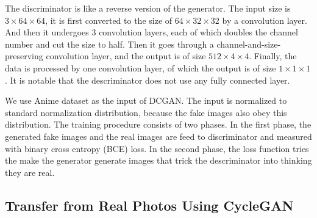 \documentclass[10pt,twocolumn,letterpaper]{article}
\begin{document}
The discriminator is like a reverse version of the generator. The input size is
$3\times 64\times 64$, it is first converted to the size of
$64\times 32\times 32$ by a convolution layer. And then it undergoes 3
convolution layers, each of which doubles the channel number and cut the size to
half. Then it goes through a channel-and-size-preserving convolution layer, and
the output is of size $512\times 4\times 4$. Finally, the data is processed by
one convolution layer, of which the output is of size $1\times 1\times 1$. It is
notable that the descriminator does not use any fully connected layer.

We use Anime dataset as the input of DCGAN. The input is normalized to standard
normalization distribution, because the fake images also obey this distribution.
The training procedure consists of two phases. In the first phase, the generated
fake images and the real images are feed to discriminator and measured with
binary cross entropy (BCE) loss. In the second phase, the loss function tries the make
the generator generate images that trick the descriminator into thinking they
are real.

\subsection{Transfer from Real Photos Using CycleGAN}
\end{document}
